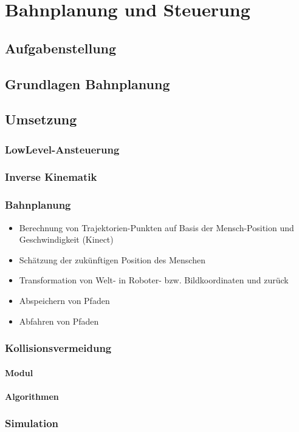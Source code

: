 
\chapter{Bahnplanung und Steuerung}


\section{Aufgabenstellung}


\section{Grundlagen Bahnplanung}



\section{Umsetzung}


\subsection{LowLevel-Ansteuerung}


\subsection{Inverse Kinematik}


\subsection{Bahnplanung}

\begin{itemize}
	\item  Berechnung von Trajektorien-Punkten auf Basis der Mensch-Position und Geschwindigkeit (Kinect)
	\item Schätzung der zukünftigen Position des Menschen
	\item Transformation von Welt- in Roboter- bzw. Bildkoordinaten und zurück
	\item Abspeichern von Pfaden
	\item Abfahren von Pfaden
\end{itemize}


\subsection{Kollisionsvermeidung}

\subsubsection{Modul}

\subsubsection{Algorithmen}


\subsection{Simulation}
